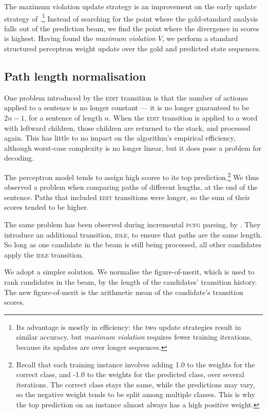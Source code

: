 \documentclass[11pt,letterpaper]{article}
\begin{document}
The maximum violation update strategy is an improvement on the early update
strategy of \citet{collins:02}.\footnote{Its advantage is mostly in efficiency:
the two update strategies result in similar accuracy, but \emph{maximum violation}
requires fewer training iterations, because its updates are over longer sequences.}
Instead of searching for the point where the
gold-standard analysis falls out of the prediction beam, we find the point
where the divergence in scores is highest. Having found the \emph{maximum violation}
$V$, we perform a standard structured perceptron weight update over the gold and
predicted state sequences.


\subsection{Path length normalisation}

One problem introduced by the \textsc{edit} transition is that the number of
actionss applied to a sentence is no longer constant --- it is no longer guaranteed
to be $2n-1$, for a sentence of length $n$. When the \textsc{edit} transition is
applied to a word with leftward children, those children are returned to the stack,
and processed again.  This has little to no impact on the algorithm's empirical
efficiency, although worst-case complexity is no longer linear, but it does
pose a problem for decoding.

The perceptron model tends to assign
high scores to its top prediction.\footnote{Recall that each training instance
involves adding 1.0 to the weights for the correct class, and -1.0 to the weights
for the predicted class, over several iterations. The correct class stays the
same, while the predictions may vary, so the negative weight tends to be split
among multiple classes. This is why the top prediction on an instance almost
always has a high positive weight.}
We thus observed a problem when comparing paths of different lengths, at the end
of the sentence. Paths that included \textsc{edit} transitions were longer,
so the sum of their scores tended to be higher.

The same problem has been observed during incremental \textsc{pcfg} parsing,
by \citet{zhang:13}.  They introduce an additional transition, \textsc{idle},
to ensure that paths are the same length. So long as one candidate in the beam
is still being processed, all other candidates apply the \textsc{idle} transition.

We adopt a simpler solution.  We normalise the figure-of-merit, which is used to rank
candidates in the beam, by the length of the candidates' transition history. The
new figure-of-merit is the
arithmetic mean of the candidate's transition scores.
\end{document}
